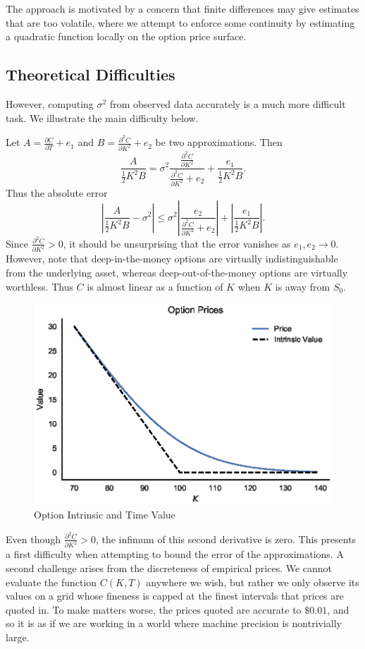 \documentclass[11pt]{article}
\numberwithin{equation}{section}
\newcommand{\diff}[2]{\frac{\partial #1}{\partial #2}}
\newcommand{\abs}[1]{\left|#1\right|}
\begin{document}
The approach is motivated by a concern that finite differences may give
estimates that are too volatile, where we attempt to enforce some continuity by
estimating a quadratic function locally on the option price surface.


\subsection{Theoretical Difficulties}
However, computing $\sigma^2$ from observed data accurately is a much more
difficult task. We illustrate the main difficulty below.

Let $A = \diff{C}{T} + e_1$ and $B = \diff{^2C}{K^2} + e_2$ be two
approximations. Then \[ \frac{A}{\frac{1}{2}K^2 B} = \sigma^2
\frac{\diff{^2C}{K^2}}{\diff{^2C}{K^2} + e_2} + \frac{e_1}{\frac{1}{2}K^2 B}.
\]
Thus the absolute error \[
\abs{\frac{A}{\frac{1}{2}K^2 B} - \sigma^2} \le \sigma^2
\abs{\frac{e_2}{\diff{^2C}{K^2}+e_2}} + \abs{\frac{e_1}{\frac{1}{2}K^2B}}.
\]
Since $\diff{^2C}{K^2} > 0$, it should be unsurprising that the error vanishes
as $e_1,e_2 \to 0$. However, note that deep-in-the-money options are virtually
indistinguishable from the underlying asset, whereas deep-out-of-the-money
options are virtually worthless. Thus $C$ is almost linear as a function of $K$
when $K$ is away from $S_0$.

\begin{figure}[h]
\centering
\includegraphics{figs/intrinsicvalue}
\caption{Option Intrinsic and Time Value}
\label{fig:intrinsicvalue}
\end{figure}

Even though $\diff{^2C}{K^2} > 0$, the infimum of this second derivative is
zero. This presents a first difficulty when attempting to bound the error of the
approximations. A second challenge arises from the discreteness of empirical
prices. We cannot evaluate the function $C(K,T)$ anywhere we wish, but rather we
only observe its values on a grid whose fineness is capped at the finest
intervals that prices are quoted in. To make matters worse, the prices quoted
are accurate to $\$0.01$, and so it is as if we are working in a world where
machine precision is nontrivially large.
\end{document}
